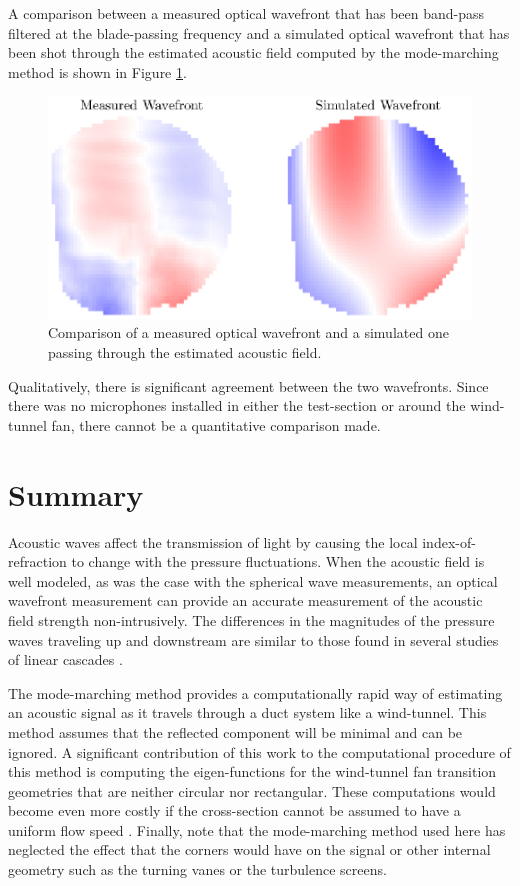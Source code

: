 A comparison between a measured optical wavefront that has been band-pass filtered at the blade-passing frequency and a simulated optical wavefront that has been shot through the estimated acoustic field computed by the mode-marching method is shown in Figure \ref{fig:03_tunnel_comparison}.
\begin{figure}
  \centering
  \includegraphics{../matlab/03_aero_optics_acoustics/tunnel_comparison.eps}
  \caption{Comparison of a measured optical wavefront and a simulated one passing through the estimated acoustic field.}
  \label{fig:03_tunnel_comparison}
\end{figure}
Qualitatively, there is significant agreement between the two wavefronts.
Since there was no microphones installed in either the test-section or around the wind-tunnel fan, there cannot be a quantitative comparison made.

\section{Summary}
\label{sect:03_summary}
Acoustic waves affect the transmission of light by causing the local index-of-refraction to change with the pressure fluctuations.
When the acoustic field is well modeled, as was the case with the spherical wave measurements, an optical wavefront measurement can provide an accurate measurement of the acoustic field strength non-intrusively.
The differences in the magnitudes of the pressure waves traveling up and downstream are similar to those found in several studies of linear cascades \cite{Fabian-1999-zZDCDcY7,Fabian-2001-jCNwBNby}.

The mode-marching method provides a computationally rapid way of estimating an acoustic signal as it travels through a duct system like a wind-tunnel.
This method assumes that the reflected component will be minimal and can be ignored.
A significant contribution of this work to the computational procedure of this method is computing the eigen-functions for the wind-tunnel fan transition geometries that are neither circular nor rectangular.
These computations would become even more costly if the cross-section cannot be assumed to have a uniform flow speed \cite{Wilson-2019-VV2zh7Au}.
Finally, note that the mode-marching method used here has neglected the effect that the corners would have on the signal or other internal geometry such as the turning vanes or the turbulence screens.

